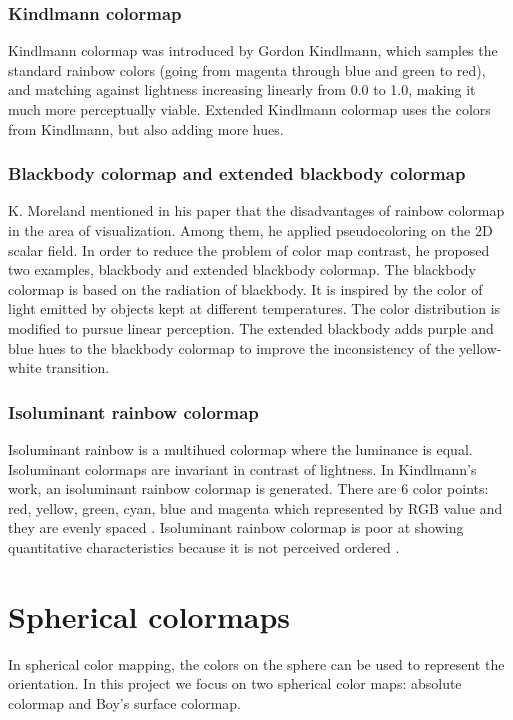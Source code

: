 \documentclass[hyperref, plainreport, noproblem]{cgvpub1}
\begin{document}
\subsubsection*{Kindlmann colormap}
Kindlmann colormap was introduced by Gordon Kindlmann, which samples the standard rainbow colors (going from magenta through blue and green to red), and matching against lightness increasing linearly from 0.0 to 1.0, \cite{kindlmann} making it much more perceptually viable. Extended Kindlmann colormap uses the colors from Kindlmann, but also adding more hues.

\subsubsection*{Blackbody colormap and extended blackbody colormap}
K. Moreland mentioned in his paper \cite{moreland2016} that the disadvantages of rainbow colormap in the area of visualization. Among them, he applied pseudocoloring on the 2D scalar field. In order to reduce the problem of color map contrast, he proposed two examples, blackbody and extended blackbody colormap. The blackbody colormap is based on the radiation of blackbody. It is inspired by the color of light emitted by objects kept at different temperatures. The color distribution is modified to pursue linear perception. The extended blackbody adds purple and blue hues to the blackbody colormap to improve the inconsistency of the yellow-white transition. 

\subsubsection*{Isoluminant rainbow colormap}
Isoluminant rainbow is a multihued colormap where the luminance is equal. Isoluminant colormaps are invariant in contrast of lightness. In Kindlmann’s work, an isoluminant rainbow colormap is generated. There are 6 color points: red, yellow, green, cyan, blue and magenta which represented by RGB value and they are evenly spaced \cite{kindlmann}. Isoluminant rainbow colormap is poor at showing quantitative characteristics because it is not perceived ordered \cite{moreland2019}. 

\section{Spherical colormaps}

In spherical color mapping, the colors on the sphere can be used to represent the orientation. In this project we focus on two spherical color maps: absolute colormap and Boy’s surface colormap.
\end{document}
